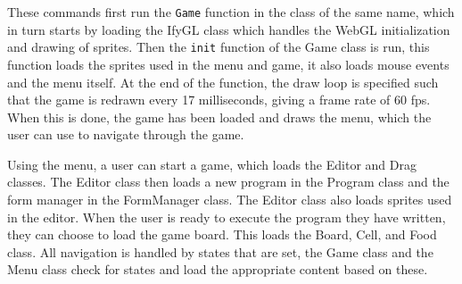 These commands first run the \texttt{Game} function in the class of the same name, which in turn starts by loading the IfyGL class which handles the WebGL initialization and drawing of sprites. Then the \texttt{init} function of the Game class is run, this function loads the sprites used in the menu and game, it also loads mouse events and the menu itself. At the end of the function, the draw loop is specified such that the game is redrawn every 17 milliseconds, giving a frame rate of 60 fps.
When this is done, the game has been loaded and draws the menu, which the user can use to navigate through the game.\newline

Using the menu, a user can start a game, which loads the Editor and Drag classes. The Editor class then loads a new program in the Program class and the form manager in the FormManager class. The Editor class also loads sprites used in the editor. When the user is ready to execute the program they have written, they can choose to load the game board. This loads the Board, Cell, and Food class. All navigation is handled by states that are set, the Game class and the Menu class check for states and load the appropriate content based on these.